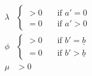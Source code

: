 \begin{align*}
  \lambda & 
  \begin{cases}
    >0 \quad &\text{if } a'=0
    \\
    =0 \quad &\text{if } a'>0
  \end{cases}
  \\
  \phi & 
  \begin{cases}
    >0 \quad &\text{if } b'=\underline{b}
    \\
    =0 \quad &\text{if } b'>\underline{b}
  \end{cases}
  \\
  \mu&>0
\end{align*}
